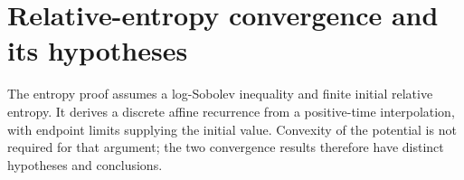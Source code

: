 \documentclass[11pt,a4paper]{article}
\begin{document}
\section{\texorpdfstring{Relative-entropy convergence and its hypotheses}{Relative-entropy convergence and its hypotheses}}


The entropy proof assumes a log-Sobolev inequality and finite initial relative entropy. It derives a discrete affine recurrence from a positive-time interpolation, with endpoint limits supplying the initial value. Convexity of the potential is not required for that argument; the two convergence results therefore have distinct hypotheses and conclusions.
\end{document}

